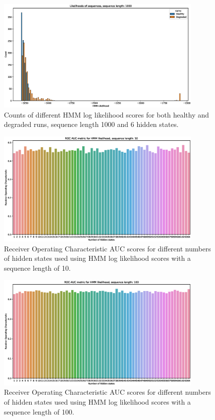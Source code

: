 \documentclass[journal]{IEEEtran}
\begin{document}
\begin{figure}[h]
 \centering
 \includegraphics[width=10cm,keepaspectratio=true]{./hmm_histograms_1000.eps}
 \caption{Counts of different HMM log likelihood scores for both healthy and degraded runs, sequence length 1000 and 6 hidden states.}
 \label{figure:log_likelihood_1000}
\end{figure}

\begin{figure}[h]
 \centering
 \includegraphics[width=10cm,keepaspectratio=true]{./roc_hmm_score_10.eps}
 \caption{Receiver Operating Characteristic AUC scores for different numbers of hidden states used using HMM log likelihood scores with a sequence length of 10.}
 \label{figure:roc_log_likelihoods_10}
\end{figure}

\begin{figure}[h]
 \centering
 \includegraphics[width=10cm,keepaspectratio=true]{./roc_hmm_score_100.eps}
 \caption{Receiver Operating Characteristic AUC scores for different numbers of hidden states used using HMM log likelihood scores with a sequence length of 100.}
 \label{figure:roc_log_likelihoods_100}
\end{figure}
\end{document}
